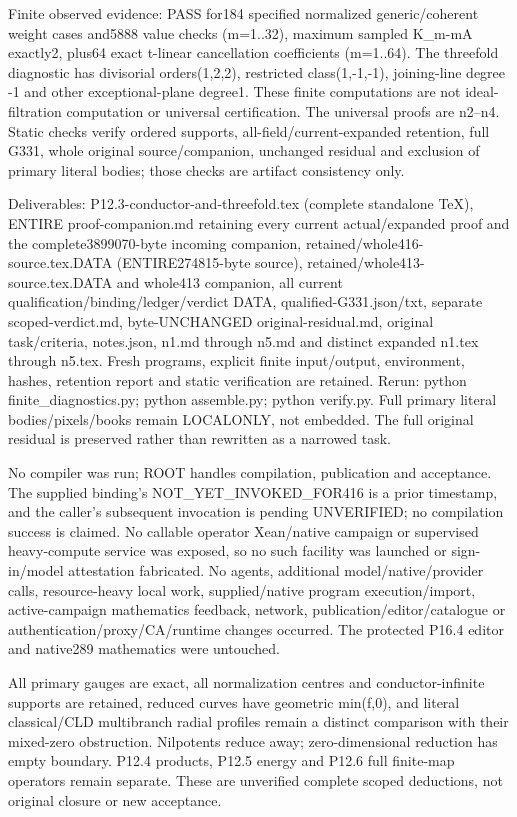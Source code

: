 Finite observed evidence: PASS for184 specified normalized generic/coherent weight cases and5888 value checks (m=1..32), maximum sampled K\_m-mA exactly2, plus64 exact t-linear cancellation coefficients (m=1..64). The threefold diagnostic has divisorial orders(1,2,2), restricted class(1,-1,-1), joining-line degree -1 and other exceptional-plane degree1. These finite computations are not ideal-filtration computation or universal certification. The universal proofs are n2--n4. Static checks verify ordered supports, all-field/current-expanded retention, full G331, whole original source/companion, unchanged residual and exclusion of primary literal bodies; those checks are artifact consistency only.

Deliverables: P12.3-conductor-and-threefold.tex (complete standalone TeX), ENTIRE proof-companion.md retaining every current actual/expanded proof and the complete3899070-byte incoming companion, retained/whole416-source.tex.DATA (ENTIRE274815-byte source), retained/whole413-source.tex.DATA and whole413 companion, all current qualification/binding/ledger/verdict DATA, qualified-G331.json/txt, separate scoped-verdict.md, byte-UNCHANGED original-residual.md, original task/criteria, notes.json, n1.md through n5.md and distinct expanded n1.tex through n5.tex. Fresh programs, explicit finite input/output, environment, hashes, retention report and static verification are retained. Rerun: python finite\_diagnostics.py; python assemble.py; python verify.py. Full primary literal bodies/pixels/books remain LOCALONLY, not embedded. The full original residual is preserved rather than rewritten as a narrowed task.

No compiler was run; ROOT handles compilation, publication and acceptance. The supplied binding's NOT\_YET\_INVOKED\_FOR416 is a prior timestamp, and the caller's subsequent invocation is pending UNVERIFIED; no compilation success is claimed. No callable operator Xean/native campaign or supervised heavy-compute service was exposed, so no such facility was launched or sign-in/model attestation fabricated. No agents, additional model/native/provider calls, resource-heavy local work, supplied/native program execution/import, active-campaign mathematics feedback, network, publication/editor/catalogue or authentication/proxy/CA/runtime changes occurred. The protected P16.4 editor and native289 mathematics were untouched.

All primary gauges are exact, all normalization centres and conductor-infinite supports are retained, reduced curves have geometric min(f,0), and literal classical/CLD multibranch radial profiles remain a distinct comparison with their mixed-zero obstruction. Nilpotents reduce away; zero-dimensional reduction has empty boundary. P12.4 products, P12.5 energy and P12.6 full finite-map operators remain separate. These are unverified complete scoped deductions, not original closure or new acceptance.

